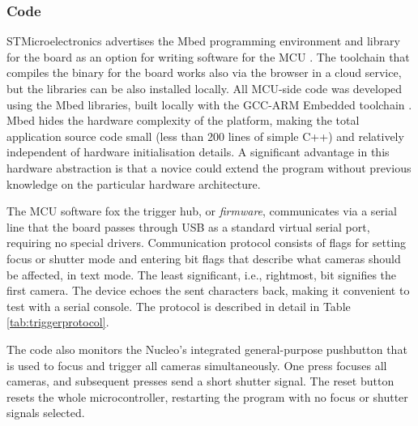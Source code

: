 


\subsubsection{Code}

STMicroelectronics advertises the Mbed programming environment and library for the board as an option for writing software for the MCU \cite{mbednucleo}.
The toolchain that compiles the binary for the board works also via the browser in a cloud service, but the libraries can be also installed locally.
All MCU-side code was developed using the Mbed libraries, built locally with the GCC-ARM Embedded toolchain \cite{launchpad-gcc-arm}.
Mbed hides the hardware complexity of the platform, making the total application source code small (less than 200 lines of simple C++) and relatively independent of hardware initialisation details.
A significant advantage in this hardware abstraction is that a novice could extend the program without previous knowledge on the particular hardware architecture.

The MCU software fox the trigger hub, or \emph{firmware}, communicates via a serial line that the board passes through USB as a standard virtual serial port, requiring no special drivers.
Communication protocol consists of flags for setting focus or shutter mode and entering bit flags that describe what cameras should be affected, in text mode.
The least significant, i.e., rightmost, bit signifies the first camera.
The device echoes the sent characters back, making it convenient to test with a serial console.
The protocol is described in detail in Table \ref{tab:triggerprotocol}.

The code also monitors the Nucleo's integrated general-purpose pushbutton that is used to focus and trigger all cameras simultaneously.
One press focuses all cameras, and subsequent presses send a short shutter signal.
The reset button resets the whole microcontroller, restarting the program with no focus or shutter signals selected.

